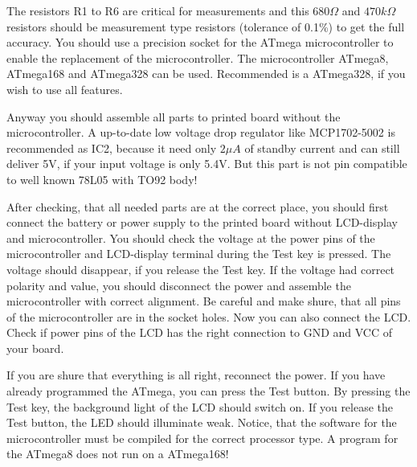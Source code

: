 The resistors R1 to R6 are critical for measurements and this \(680\Omega\) and
\(470k\Omega\) resistors should be measurement type resistors (tolerance of 0.1\%) to
get the full accuracy.
You should use a precision socket for the ATmega microcontroller to enable
the replacement of the microcontroller.
The microcontroller ATmega8, ATmega168 and ATmega328 can be used.
Recommended is a ATmega328, if you wish to use all features.

Anyway you should assemble all parts to printed board without the microcontroller.
A up-to-date low voltage drop regulator like MCP1702-5002 is recommended as IC2, because it
need only \(2\mu A\) of standby current and can still deliver 5V, if your input
voltage is only 5.4V. But this part is not pin compatible to well known 78L05 with TO92 body!

After checking, that all needed parts are at the correct place, you should
first connect the battery or power supply to the printed board without LCD-display
and microcontroller. You should check the voltage at the power pins of the
microcontroller and LCD-display terminal during the Test key is pressed.
The voltage should disappear, if you release the Test key.
If the voltage had correct polarity and value,
you should disconnect the power and assemble the microcontroller with correct
alignment. Be careful and make shure, that all pins of the microcontroller
are in the socket holes.
Now you can also connect the LCD. Check if power pins of the LCD has the right connection to
GND and VCC of your board.

If you are shure that everything is all right, reconnect the power. 
If you have already programmed the ATmega, you can press the Test button.
By pressing the Test key, the background light of the LCD should switch on.
If you release the Test button, the LED should illuminate weak.
Notice, that the software for the microcontroller must be compiled for the
correct processor type. A program for the ATmega8 does not run on a ATmega168!

